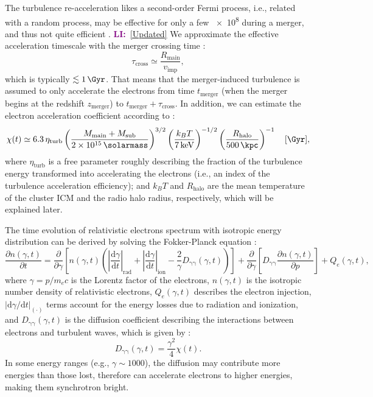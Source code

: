 \documentclass[modern]{aastex61}
\newcommand{\R}[1]{\mathrm{#1}}
\newcommand{\D}[1]{\R{d} #1}
\newcommand{\diff}[2]{\frac{\D{#1}}{\D{#2}}}
\newcommand{\pdiff}[2]{\frac{\partial #1}{\partial #2}}
\newcommand{\LI}[1]{\textcolor{purple}{\textbf{LI:}}~\uline{#1}}
\begin{document}
The turbulence re-acceleration likes a second-order Fermi process, i.e.,
related with a random process, may be effective for only a few
\SI{e8}{\year} during a merger, and thus not quite efficient
\citep{feretti2012rev,ensslin2011}.
\LI{[Updated]}
We approximate the effective acceleration timescale with the merger
crossing time \citep{cassano2005}:
\begin{equation}
  \label{eq:tau-cross}
  \tau_{\R{cross}} \simeq \frac{R_{\R{main}}}{v_{\R{imp}}},
\end{equation}
which is typically $\lesssim \SI{1}{\Gyr}$.
That means that the merger-induced turbulence is assumed to only accelerate
the electrons from time $t_{\R{merger}}$ (when the merger begins at the
redshift $z_{\R{merger}}$) to $t_{\R{merger}} + \tau_{\R{cross}}$.
In addition, we can estimate the electron acceleration coefficient
according to \citep{cassano2005}:
\begin{equation}
  \label{eq:electron-acc}
  \chi(t) \simeq 6.3 \,\eta_{\R{turb}}
      \left( \frac{M_{\R{main}} + M_{\R{sub}}}{\SI{2e15}{\solarmass}} \right)^{3/2}
      \left( \frac{k_BT}{\SI{7}{\keV}} \right)^{-1/2}
      \left( \frac{R_{\R{halo}}}{\SI{500}{\kpc}} \right)^{-1}
  \quad [\si{\per\Gyr}],
\end{equation}
where $\eta_{\R{turb}}$ is a free parameter roughly describing the fraction
of the turbulence energy transformed into accelerating the electrons (i.e.,
an index of the turbulence acceleration efficiency);
and $k_BT$ and $R_{\R{halo}}$ are the mean temperature of the cluster ICM
and the radio halo radius, respectively, which will be explained later.

The time evolution of relativistic electrons spectrum with isotropic energy
distribution can be derived by solving the Fokker-Planck equation
\citep{eilek1991,schlickeiser2002}:
\begin{equation}
  \label{eq:fokkerplanck}
  \pdiff{n(\gamma,t)}{t} = \pdiff{}{\gamma} \left[ n(\gamma,t) \left(
      \left| \diff{\gamma}{t} \right|_{\R{rad}} +
      \left| \diff{\gamma}{t} \right|_{\R{ion}} -
      \frac{2}{\gamma} D_{\R{\gamma\gamma}}(\gamma, t) \right) \right] +
  \pdiff{}{\gamma} \left[ D_{\R{\gamma\gamma}} \pdiff{n(\gamma,t)}{p} \right] +
  Q_e(\gamma,t),
\end{equation}
where $\gamma = p / m_e c$ is the Lorentz factor of the electrons,
$n(\gamma, t)$ is the isotropic number density of relativistic
electrons, $Q_e(\gamma, t)$ describes the electron injection,
$|\R{d}\gamma / \R{d}t|_{(\cdot)}$ terms account for the
energy losses due to radiation and ionization,
and $D_{\R{\gamma\gamma}}(\gamma, t)$ is the diffusion coefficient
describing the interactions between electrons and turbulent waves,
which is given by \citep{brunetti2011}:
\begin{equation}
  \label{eq:diffusion-coef}
  D_{\R{\gamma\gamma}}(\gamma, t) = \frac{\gamma^2}{4} \chi(t).
\end{equation}
In some energy ranges (e.g., $\gamma \sim 1000$), the diffusion may
contribute more energies than those lost, therefore can accelerate electrons
to higher energies, making them synchrotron bright.
\end{document}
